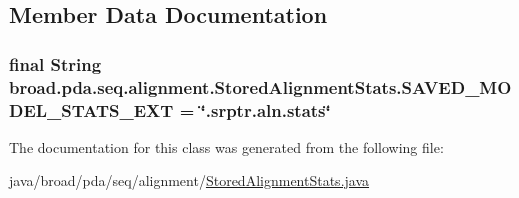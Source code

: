 \subsection{Member Data Documentation}
\hypertarget{classbroad_1_1pda_1_1seq_1_1alignment_1_1_stored_alignment_stats_a900895cff3a06f322818dd8bf97f1193}{
\subsubsection[{S\+A\+V\+E\+D\+\_\+\+M\+O\+D\+E\+L\+\_\+\+S\+T\+A\+T\+S\+\_\+\+E\+X\+T}]{\setlength{\rightskip}{0pt plus 5cm}final String broad.\+pda.\+seq.\+alignment.\+Stored\+Alignment\+Stats.\+S\+A\+V\+E\+D\+\_\+\+M\+O\+D\+E\+L\+\_\+\+S\+T\+A\+T\+S\+\_\+\+E\+X\+T = \char`\"{}.srptr.\+aln.\+stats\char`\"{}\hspace{0.3cm}{\ttfamily [static]}}}\label{classbroad_1_1pda_1_1seq_1_1alignment_1_1_stored_alignment_stats_a900895cff3a06f322818dd8bf97f1193}


The documentation for this class was generated from the following file\+:\begin{DoxyCompactItemize}
\item 
java/broad/pda/seq/alignment/\hyperlink{_stored_alignment_stats_8java}{Stored\+Alignment\+Stats.\+java}\end{DoxyCompactItemize}
